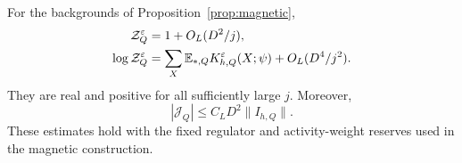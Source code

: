 \begin{lemma}
\label{lem:terminal-partition}
For the backgrounds of Proposition~\ref{prop:magnetic},
\begin{align}
 \mathcal Z_Q^\varepsilon&=1+O_L(D^2/j),
 \label{eq:terminal-partition-small}\\
 \log\mathcal Z_Q^\varepsilon
 &=\sum_X\mathbb E_{*,Q}K^\varepsilon_{h,Q}(X;\psi)
       +O_L(D^4/j^2).
 \label{eq:terminal-log}
\end{align}
They are real and positive for all sufficiently large $j$.  Moreover,
\begin{equation}
 |\mathcal J_Q|
 \leq C_LD^2\|I_{h,Q}\|.
 \label{eq:terminal-insertion}
\end{equation}
These estimates hold with the fixed regulator and activity-weight
reserves used in the magnetic construction.
\end{lemma}


